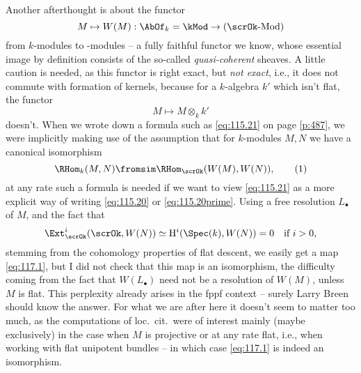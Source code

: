 Another afterthought is about the functor
\[M\mapsto W(M): \AbOf_k = \kMod\to(\scrOk\textup{-Mod})\]
from $k$-modules to \scrOk-modules -- a fully faithful functor we
know, whose essential image by definition consists of the so-called
\emph{quasi-coherent} sheaves. A little caution is needed, as this
functor is right exact, but \emph{not exact}, i.e., it does not
commute with formation of kernels, because for a $k$-algebra $k'$
which isn't flat, the functor
\[M\mapsto M\otimes_k k'\]
doesn't. When we wrote down a formula such as
\eqref{eq:115.21} on page \ref{p:487}, we were implicitly making use
of the assumption that for $k$-modules $M,N$ we have a canonical
isomorphism
\begin{equation}
  \label{eq:117.1}
  \RHom_k(M,N) \fromsim \RHom_\scrOk(W(M),W(N)),\tag{1}
\end{equation}
at any rate such a formula is needed if we want to view
\eqref{eq:115.21} as a more explicit way of writing \eqref{eq:115.20}
or \eqref{eq:115.20prime}. Using a free resolution $L_\bullet$ of $M$,
and the fact that
\[\Ext_\scrOk^i(\scrOk, W(N)) \simeq \mathrm H^i(\Spec(k),W(N)) = 0
\quad\text{if $i>0$,}\]
stemming from the cohomology properties of flat descent, we easily get
a map \eqref{eq:117.1}, but I did not check that this map is an
isomorphism, the difficulty coming from the fact that $W(L_\bullet)$
need not be a resolution of $W(M)$, unless $M$ is flat. This
perplexity already arises in the fppf context -- surely Larry Breen
should know the answer. For what we are after here it doesn't seem to
matter too much, as the computations of loc.\ cit.\ were of interest
mainly (maybe exclusively) in the case when $M$ is projective or at
any rate flat, i.e., when working with flat unipotent bundles -- in
which case \eqref{eq:117.1} is indeed an isomorphism.

